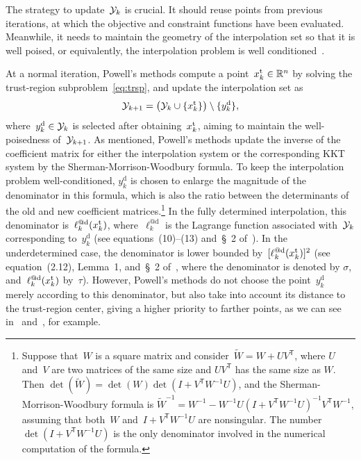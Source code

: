 \documentclass{article}
\numberwithin{equation}{section}
\theoremstyle{definition}
\theoremstyle{plain}
\theoremstyle{remark}
\newcommand*{\R}{\mathbb{R}}
\newcommand*{\T}{\mathsf{T}}
\newcommand*{\set}[2][]{#1\{#2#1\}}
\newcommand{\drop}{{\text{d}}}
\newcommand{\trust}{{\text{t}}}
\newcommand{\iter}[1][k]{x\ifthenelse{\equal{#1}{}}{}{_{#1}}}
\newcommand{\xpt}[1][k]{\mathcal{Y}\ifthenelse{\equal{#1}{}}{}{_{#1}}}
\begin{document}
The strategy to update~$\xpt$ is crucial.
It should reuse points from previous iterations, at which the objective and constraint functions have been evaluated.
Meanwhile, it needs to maintain the geometry of the interpolation set so that it is well poised, or equivalently, the interpolation problem is well conditioned~\cite{Conn_Scheinberg_Vicente_2009b}.

At a normal iteration, Powell's methods compute a point~$\iter^{\trust} \in \R^n$ by solving the trust-region subproblem~\eqref{eq:trsp}, and update the interpolation set as
\begin{equation}
    \label{eq:xpt-update-tr}
    \xpt[k + 1] = \big(\xpt \cup \set{\iter^{\trust}}\big) \setminus \set{y_k^{\drop}},
\end{equation}
where~$y_k^{\drop} \in \xpt$ is selected after obtaining~$\iter^{\trust}$, aiming to maintain the well-poisedness of~$\xpt[k + 1]$.
As mentioned, Powell's methods update the inverse of the coefficient matrix for either the interpolation system or the corresponding KKT system by the Sherman-Morrison-Woodbury formula.
To keep the interpolation problem well-conditioned, $y_k^{\drop}$ is chosen
to enlarge the magnitude of the denominator in this formula, which is also the ratio between the determinants of the old and new coefficient matrices.\footnote{
    Suppose that~$W$ is a square matrix and consider~$\widetilde{W} = W + UV^\T$, where $U$ and~$V$ are two matrices of the same size and $UV^\T$ has the same size as $W$.
    Then $\det(\widetilde{W}) = \det(W)\det(I+V^\T W^{-1}U)$, and the Sherman-Morrison-Woodbury formula is $\widetilde{W}^{-1} = W^{-1} -W^{-1}U(I+V^\T W^{-1}U)^{-1} V^\T W^{-1}$, assuming that both~$W$ and~$I+V^\T W^{-1}U$ are nonsingular.
    The number~$\det(I+V^\T W^{-1}U)$ is the only denominator involved in the numerical computation of the formula.
}
In the fully determined interpolation, this denominator is~$\ell_k^{@\drop}(\iter^{\trust})$, where~$\ell_k^{@\drop}$ is the Lagrange function associated with~$\xpt$ corresponding to~$y_k^\drop$ (see equations~(10)--(13) and~\S~2 of~\cite{Powell_2001}).
In the underdetermined case, the denominator is lower bounded by~$[\ell_k^{@\drop}(\iter^{\trust})]^2$ (see equation~(2.12), Lemma~1, and~\S~2 of~\cite{Powell_2004c}, where the denominator is denoted by $\sigma$, and~$\ell_k^{@\drop}(\iter^{\trust})$ by~$\tau$).
However, Powell's methods do not choose the point~$y_k^\drop$ merely according to this denominator, but also take into account its distance to the trust-region center, giving a higher priority to farther points, as we can see in~\cite[Equation~(56)]{Powell_2002} and~\cite[Equations~(7.4)--(7.5)]{Powell_2006}, for example.
\end{document}
